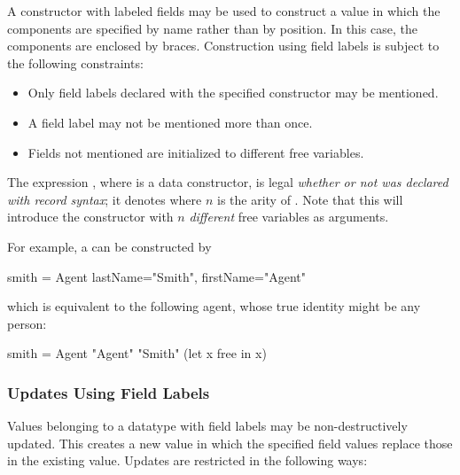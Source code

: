 A constructor with labeled fields may be used to construct a value in
which the components are specified by name rather than by
position. In this case, the components are enclosed by braces.
Construction using field labels is subject to the following
constraints:
%
\begin{itemize}
\item Only field labels declared with the specified constructor may be
  mentioned.
\item A field label may not be mentioned more than once.
\item Fields not mentioned are initialized to different free variables.
\end{itemize}
%
The expression , where  is a data constructor,
is legal \emph{whether or not   was declared with record syntax};
it denotes 
where $n$ is the arity of .
Note that this will introduce the constructor  with
$n$ \emph{different} free variables as arguments.


\noindent
For example, a  can be constructed by
\begin{curry}
smith = Agent {lastName="Smith", firstName="Agent"}
\end{curry}
which is equivalent to the following agent, whose true identity
might be any person:
\begin{curry}
smith = Agent "Agent" "Smith" (let x free in x)
\end{curry}

\subsubsection{Updates Using Field Labels}\label{flab-upd}

Values belonging to a datatype with field labels may be
non-destructively updated. This creates a new value in which the
specified field values replace those in the existing value. Updates
are restricted in the following ways:

